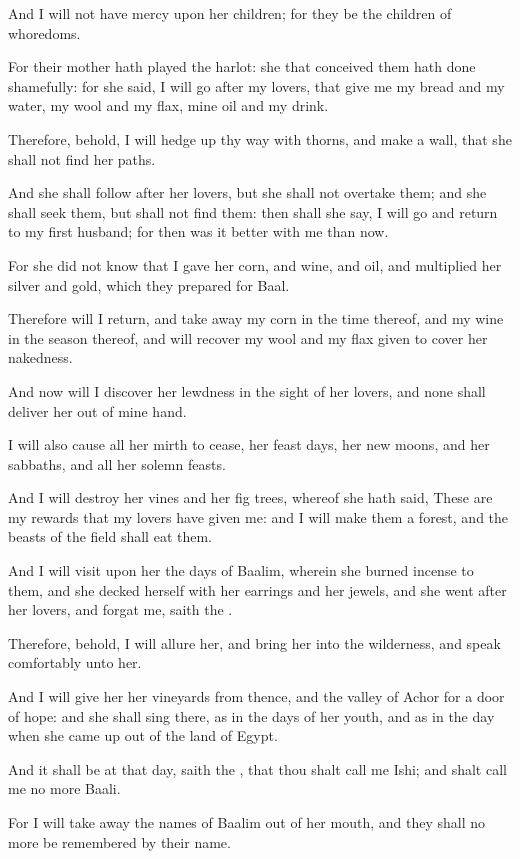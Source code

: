 \Verse And I will not have mercy upon her children; for they be the children of whoredoms.

\Verse For their mother hath played the harlot: she that conceived them hath done shamefully: for she said, I will go after my lovers, that give me my bread and my water, my wool and my flax, mine oil and my drink.

\Verse Therefore, behold, I will hedge up thy way with thorns, and make a wall, that she shall not find her paths.

\Verse And she shall follow after her lovers, but she shall not overtake them; and she shall seek them, but shall not find them: then shall she say, I will go and return to my first husband; for then was it better with me than now.

\Verse For she did not know that I gave her corn, and wine, and oil, and multiplied her silver and gold, which they prepared for Baal.

\Verse Therefore will I return, and take away my corn in the time thereof, and my wine in the season thereof, and will recover my wool and my flax given to cover her nakedness.

\Verse And now will I discover her lewdness in the sight of her lovers, and none shall deliver her out of mine hand.

\Verse I will also cause all her mirth to cease, her feast days, her new moons, and her sabbaths, and all her solemn feasts.

\Verse And I will destroy her vines and her fig trees, whereof she hath said, These are my rewards that my lovers have given me: and I will make them a forest, and the beasts of the field shall eat them.

\Verse And I will visit upon her the days of Baalim, wherein she burned incense to them, and she decked herself with her earrings and her jewels, and she went after her lovers, and forgat me, saith the \LORD.

\Verse Therefore, behold, I will allure her, and bring her into the wilderness, and speak comfortably unto her.

\Verse And I will give her her vineyards from thence, and the valley of Achor for a door of hope: and she shall sing there, as in the days of her youth, and as in the day when she came up out of the land of Egypt.

\Verse And it shall be at that day, saith the \LORD, that thou shalt call me Ishi; and shalt call me no more Baali.

\Verse For I will take away the names of Baalim out of her mouth, and they shall no more be remembered by their name.

